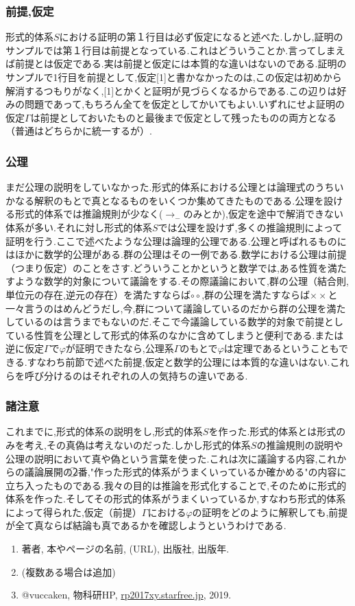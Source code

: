 \documentclass[10pt,b5paper,papersize,dvipdfmx]{jsbook}
\begin{document}
\subsubsection{前提,仮定}
形式的体系$S$における証明の第１行目は必ず仮定になると述べた.しかし,証明のサンプルでは第１行目は前提となっている.これはどういうことか.言ってしまえば前提とは仮定である.実は前提と仮定には本質的な違いはないのである.証明のサンプルで1行目を前提として,仮定[1]と書かなかったのは,この仮定は初めから解消するつもりがなく,[1]とかくと証明が見づらくなるからである.この辺りは好みの問題であって,もちろん全てを仮定としてかいてもよい.いずれにせよ証明の仮定$\Gamma$は前提としておいたものと最後まで仮定として残ったものの両方となる（普通はどちらかに統一するが）.

\subsubsection{公理}
まだ公理の説明をしていなかった.形式的体系における公理とは論理式のうちいかなる解釈のもとで真となるものをいくつか集めてきたものである.公理を設ける形式的体系では推論規則が少なく($\to_-$のみとか),仮定を途中で解消できない体系が多い.それに対し形式的体系$S$では公理を設けず,多くの推論規則によって証明を行う.ここで述べたような公理は論理的公理である.公理と呼ばれるものにはほかに数学的公理がある.群の公理はその一例である.数学における公理は前提（つまり仮定）のことをさす.どういうことかというと数学では,ある性質を満たすような数学的対象について議論をする.その際議論において,群の公理（結合則,単位元の存在,逆元の存在）を満たすならば$\circ \circ$,群の公理を満たすならば$\times \times$と一々言うのはめんどうだし,今,群について議論しているのだから群の公理を満たしているのは言うまでもないのだ.そこで今議論している数学的対象で前提としている性質を公理として形式的体系のなかに含めてしまうと便利である.または逆に仮定$\Gamma$で$\varphi$が証明できたなら,公理系$\Gamma$のもとで$\varphi$は定理であるということもできる.すなわち前節で述べた前提,仮定と数学的公理には本質的な違いはない.これらを呼び分けるのはそれぞれの人の気持ちの違いである.

\subsubsection{諸注意}
これまでに,形式的体系の説明をし,形式的体系$S$を作った.形式的体系とは形式のみを考え,その真偽は考えないのだった.しかし$形式的体系S$の推論規則の説明や公理の説明において真や偽という言葉を使った.これは次に議論する内容,これからの議論展開の\textcircled{\scriptsize 2}番,"作った形式的体系がうまくいっているか確かめる"の内容に立ち入ったものである.我々の目的は推論を形式化することで,そのために形式的体系を作った.そしてその形式的体系がうまくいっているか,すなわち形式的体系によって得られた,仮定（前提）$\Gamma$における$\varphi$の証明をどのように解釈しても,前提が全て真ならば結論も真であるかを確認しようというわけである.

\begin{sanko}
  \begin{enumerate}
    \item 著者, 本やページの名前, (URL), 出版社, 出版年.
    \item (複数ある場合は追加)
    \item @vuccaken, 物科研HP, \url{rp2017xy.starfree.jp}, 2019.
  \end{enumerate}
\end{sanko}
\end{document}
